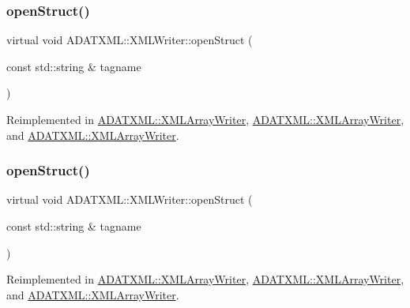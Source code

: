 \mbox{\label{classADATXML_1_1XMLWriter_a8f9728743acfd9c15ab5d69bf8800a5e}} 
\subsubsection{\texorpdfstring{openStruct()}{openStruct()}\hspace{0.1cm}{\footnotesize\ttfamily [1/3]}}
{\footnotesize\ttfamily virtual void A\+D\+A\+T\+X\+M\+L\+::\+X\+M\+L\+Writer\+::open\+Struct (\begin{DoxyParamCaption}\item[{const std\+::string \&}]{tagname }\end{DoxyParamCaption})\hspace{0.3cm}{\ttfamily [virtual]}}



Reimplemented in \mbox{\hyperlink{classADATXML_1_1XMLArrayWriter_af1602cb14d54aa8e42442f2784c00e22}{A\+D\+A\+T\+X\+M\+L\+::\+X\+M\+L\+Array\+Writer}}, \mbox{\hyperlink{classADATXML_1_1XMLArrayWriter_af1602cb14d54aa8e42442f2784c00e22}{A\+D\+A\+T\+X\+M\+L\+::\+X\+M\+L\+Array\+Writer}}, and \mbox{\hyperlink{classADATXML_1_1XMLArrayWriter_af1602cb14d54aa8e42442f2784c00e22}{A\+D\+A\+T\+X\+M\+L\+::\+X\+M\+L\+Array\+Writer}}.

\mbox{\label{classADATXML_1_1XMLWriter_a8f9728743acfd9c15ab5d69bf8800a5e}} 
\subsubsection{\texorpdfstring{openStruct()}{openStruct()}\hspace{0.1cm}{\footnotesize\ttfamily [2/3]}}
{\footnotesize\ttfamily virtual void A\+D\+A\+T\+X\+M\+L\+::\+X\+M\+L\+Writer\+::open\+Struct (\begin{DoxyParamCaption}\item[{const std\+::string \&}]{tagname }\end{DoxyParamCaption})\hspace{0.3cm}{\ttfamily [virtual]}}



Reimplemented in \mbox{\hyperlink{classADATXML_1_1XMLArrayWriter_af1602cb14d54aa8e42442f2784c00e22}{A\+D\+A\+T\+X\+M\+L\+::\+X\+M\+L\+Array\+Writer}}, \mbox{\hyperlink{classADATXML_1_1XMLArrayWriter_af1602cb14d54aa8e42442f2784c00e22}{A\+D\+A\+T\+X\+M\+L\+::\+X\+M\+L\+Array\+Writer}}, and \mbox{\hyperlink{classADATXML_1_1XMLArrayWriter_af1602cb14d54aa8e42442f2784c00e22}{A\+D\+A\+T\+X\+M\+L\+::\+X\+M\+L\+Array\+Writer}}.

